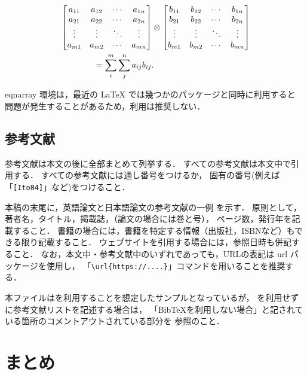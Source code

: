 \documentclass[a4paper,twocolumn,dvipdfmx]{jsarticle}
\begin{document}
\begin{align}
	& \begin{bmatrix}
	a_{11} & a_{12} & \cdots & a_{1n} \\
	a_{21} & a_{22} & \cdots & a_{2n} \\
	\vdots & \vdots & \ddots & \vdots \\
	a_{m1} & a_{m2} & \cdots & a_{mn} \\
	\end{bmatrix}
	\otimes
	\begin{bmatrix}
	b_{11} & b_{12} & \cdots & b_{1n} \\
	b_{21} & b_{22} & \cdots & b_{2n} \\
	\vdots & \vdots & \ddots & \vdots \\
	b_{m1} & b_{m2} & \cdots & b_{mn} \\
	\end{bmatrix} \notag \\
	& \qquad \qquad = \sum_{i}^{m}\sum_{j}^{n}a_{ij}b_{ij} .
	\label{eq:samp2}
\end{align}

eqnarray 環境は，最近の LaTeX では幾つかのパッケージと同時に利用すると
問題が発生することがあるため，利用は推奨しない．

\subsection{参考文献}
参考文献は本文の後に全部まとめて列挙する．
すべての参考文献は本文中で引用する．
すべての参考文献には通し番号をつけるか，
固有の番号(例えば「\verb+[Ito04]+」など)をつけること．

本稿の末尾に，英語論文と日本語論文の参考文献の一例 \cite{Ito04}\cite{Abe10} を示す．
原則として，著者名，タイトル，掲載誌，（論文の場合には巻と号），
ページ数，発行年を記載すること．
書籍の場合には，書籍を特定する情報（出版社，ISBNなど）もできる限り記載すること\cite{Ito18}．
ウェブサイト\cite{ArtScience}を引用する場合には，参照日時も併記すること．
なお，本文中・参考文献中のいずれであっても，URLの表記は url パッケージを使用し，
「\verb+\url{https://....}+」コマンドを用いることを推奨する．

本ファイルは\BibTeX を利用することを想定したサンプルとなっているが，
\BibTeX を利用せずに参考文献リストを記述する場合は，
「BibTeXを利用しない場合」と記されている箇所のコメントアウトされている部分を
参照のこと．

\section{まとめ}
\end{document}
